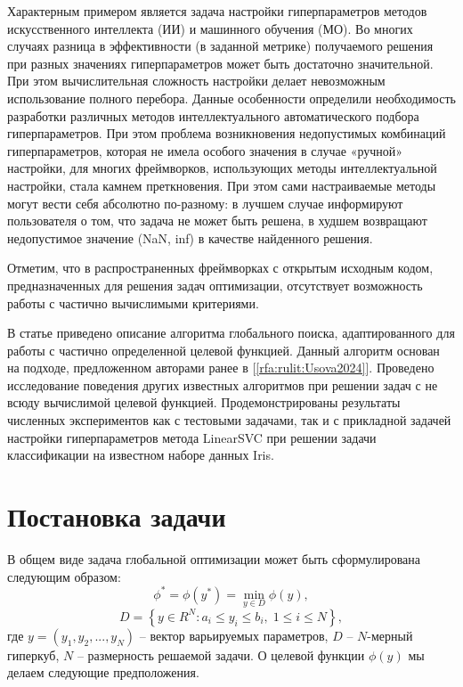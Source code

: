 \documentclass[a4paper,12pt,russian]{article}
\begin{document}
Характерным примером является задача настройки гиперпараметров методов искусственного интеллекта (ИИ) и машинного обучения (МО). Во многих случаях разница в эффективности (в заданной метрике) получаемого решения при разных значениях гиперпараметров может быть достаточно значительной. При этом вычислительная сложность настройки делает невозможным использование полного перебора. Данные особенности определили необходимость разработки различных методов интеллектуального автоматического подбора гиперпараметров. При этом проблема возникновения недопустимых комбинаций гиперпараметров, которая не имела особого значения в случае «ручной» настройки, для многих фреймворков, использующих методы интеллектуальной настройки, стала камнем преткновения. При этом сами настраиваемые методы могут вести себя абсолютно по-разному: в лучшем случае информируют пользователя о том, что задача не может быть решена, в худшем возвращают недопустимое значение (NaN, inf) в качестве найденного решения.

Отметим, что в распространенных фреймворках с открытым исходным кодом, предназначенных для решения задач оптимизации, отсутствует возможность работы с частично вычислимыми критериями.

В статье приведено описание алгоритма глобального поиска, адаптированного для работы с частично определенной целевой функцией. Данный алгоритм основан на подходе, предложенном авторами ранее в [\ref{rfa:rulit:Usova2024}]. Проведено исследование поведения других известных алгоритмов при решении задач с не всюду вычислимой целевой функцией. Продемонстрированы результаты численных экспериментов как с тестовыми задачами, так и с прикладной задачей настройки гиперпараметров метода LinearSVC при решении задачи классификации на известном наборе данных Iris.

\section{Постановка задачи}
В общем виде задача глобальной оптимизации может быть сформулирована следующим образом:
\begin{equation}\label{eq1} 
\phi^*=\phi(y^* )=\min_{y \in D}{\phi(y)},
\end{equation}
\[
D=\left\{ y \in R^N: a_i \leq y_i \leq b_i, \; 1 \leq i \leq N\right\},
\]
где $y=(y_1,y_2,...,y_N)$ -- вектор варьируемых параметров, $D$ -- $N$-мерный гиперкуб, $N$ -- размерность решаемой задачи.
О целевой функции $\phi (y)$ мы делаем следующие предположения.
\end{document}
